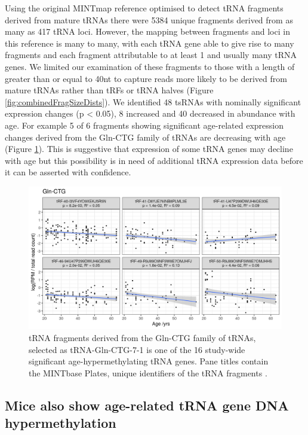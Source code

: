 \documentclass[
]{book}
\begin{document}
Using the original MINTmap reference optimised to detect tRNA fragments derived from mature tRNAs there were 5384 unique fragments derived from as many as 417 tRNA loci.
However, the mapping between fragments and loci in this reference is many to many, with each tRNA gene able to give rise to many fragments and each fragment attributable to at least 1 and usually many tRNA genes.
We limited our examination of these fragments to those with a length of greater than or equal to 40nt to capture reads more likely to be derived from mature tRNAs rather than tRFs or tRNA halves (Figure \ref{fig:combinedFragSizeDists}).
We identified 48 tsRNAs with nominally significant expression changes (p \textless{} 0.05), 8 increased and 40 decreased in abundance with age.
For example 5 of 6 fragments showing significant age-related expression changes derived from the Gln-CTG family of tRNAs are decreasing with age (Figure \ref{fig:mintmapres}).
This is suggestive that expression of some tRNA genes may decline with age but this possibility is in need of additional tRNA expression data before it can be asserted with confidence.

\begin{figure}

{\centering \includegraphics[width=1\linewidth]{./figs/nonSigIsoMapbbswsPlotsGln-CTG} 

}

\caption{tRNA fragments derived from the Gln-CTG family of tRNAs, selected as tRNA-Gln-CTG-7-1 is one of the 16 study-wide significant age-hypermethylating tRNA genes. Pane titles contain the MINTbase Plates, unique identifiers of the tRNA fragments \citep{Pliatsika2018}.}\label{fig:mintmapres}
\end{figure}



\hypertarget{mice-also-show-age-related-trna-gene-dna-hypermethylation}{%
\subsection{Mice also show age-related tRNA gene DNA hypermethylation}\label{mice-also-show-age-related-trna-gene-dna-hypermethylation}}
\end{document}

